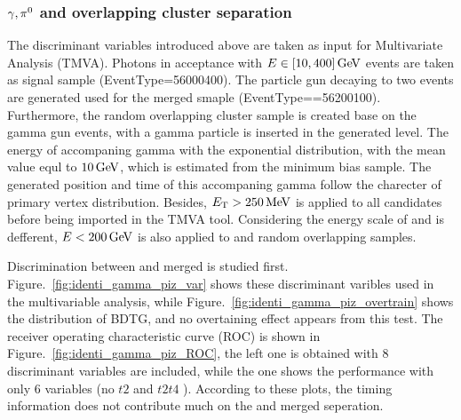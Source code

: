 \subsubsection{$\gamma, {{\pi}^0}$ and overlapping cluster separation}

The discriminant variables introduced above are taken as input for Multivariate Analysis (TMVA)\supercite{TMVA4}.
Photons in \lhcb acceptance with $E\in[10,400] \text{\,Ge\kern -0.1em V}$ events are taken as signal sample (EventType=56000400). 
The \piz particle gun decaying to two \g events are generated used for the merged \piz smaple (EventType==56200100).
Furthermore, 
the random overlapping cluster sample is created base on the gamma gun events, 
with a gamma particle is inserted in the generated level.
The energy of accompaning gamma with the exponential distribution, 
with the mean value equl to $10 \text{\,Ge\kern -0.1em V}$,
which is estimated from the minimum bias sample.
The generated position and time of this accompaning gamma follow the charecter of primary vertex distribution.
Besides, 
$E_{\mathrm{T}}>250\text{\,Me\kern -0.1em V}$ is applied to all \g candidates before being imported in the TMVA tool.
Considering the energy scale of \g and \piz is defferent, 
$E<200 \text{\,Ge\kern -0.1em V}$ is also applied to \g and random overlapping samples.  


Discrimination between \g and merged \piz is studied first.
Figure.~\ref{fig:identi_gamma_piz_var} shows these discriminant varibles used in the multivariable analysis,
while Figure.~\ref{fig:identi_gamma_piz_overtrain} shows the distribution of BDTG, 
and no overtaining effect appears from this test.
The receiver operating characteristic curve (ROC) is shown in Figure.~\ref{fig:identi_gamma_piz_ROC},
the left one is obtained with 8 discriminant variables are included, 
while the one shows the performance with only 6 variables (no $t2$ and $t2t4$ ).
According to these plots,
the timing information does not contribute much on the \g and merged \piz seperation.


